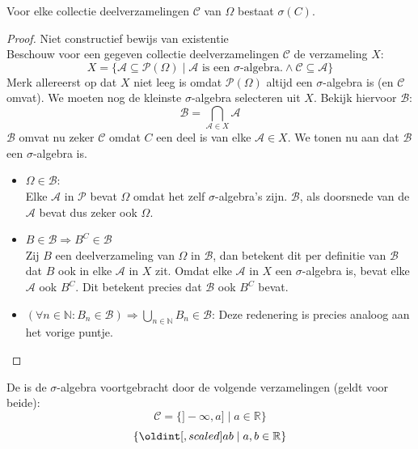 \documentclass[main.tex]{subfiles}
\begin{document}
\begin{ei}
  Voor elke collectie deelverzamelingen $\mathcal{C}$ van $\Omega$ bestaat $\sigma(C)$.

  \begin{proof}
    Niet constructief bewijs van existentie\\
    Beschouw voor een gegeven collectie deelverzamelingen $\mathcal{C}$ de verzameling $X$:
    \[ X = \{ \mathcal{A} \subseteq \mathcal{P}(\Omega) \mid \mathcal{A} \text{ is een $\sigma$-algebra.} \wedge \mathcal{C} \subseteq \mathcal{A} \} \]
    Merk allereerst op dat $X$ niet leeg is omdat $\mathcal{P}(\Omega)$ altijd een $\sigma$-algebra is (en $\mathcal{C}$ omvat).
    We moeten nog de kleinste $\sigma$-algebra selecteren uit $X$.
    Bekijk hiervoor $\mathcal{B}$:
    \[ \mathcal{B} = \bigcap_{\mathcal{A} \in X}\mathcal{A} \]
    $\mathcal{B}$ omvat nu zeker $\mathcal{C}$ omdat $C$ een deel is van elke $\mathcal{A} \in X$.
    We tonen nu aan dat $\mathcal{B}$ een $\sigma$-algebra is.
    \begin{itemize}
    \item $\Omega \in \mathcal{B}$:\\
      Elke $\mathcal{A}$ in $\mathcal{P}$ bevat $\Omega$ omdat het zelf $\sigma$-algebra's zijn.
      $\mathcal{B}$, als doorsnede van de $\mathcal{A}$ bevat dus zeker ook $\Omega$.
    \item $B \in \mathcal{B} \Rightarrow B^{C} \in \mathcal{B}$\\
      Zij $B$ een deelverzameling van $\Omega$ in $\mathcal{B}$, dan betekent dit per definitie van $\mathcal{B}$ dat $B$ ook in elke $\mathcal{A}$ in $X$ zit.
      Omdat elke $\mathcal{A}$ in $X$ een $\sigma$-algebra is, bevat elke $\mathcal{A}$ ook $B^{C}$.
      Dit betekent precies dat $\mathcal{B}$ ook $B^{C}$ bevat.
    \item $(\forall n\in \mathbb{N}: B_{n}\in \mathcal{B}) \Rightarrow \bigcup_{n\in \mathbb{N}} B_{n} \in \mathcal{B}$:
      Deze redenering is precies analoog aan het vorige puntje.
    \end{itemize}
  \end{proof}
\end{ei}

\begin{de}
  De  is de $\sigma$-algebra voortgebracht door de volgende verzamelingen (geldt voor beide):
  \[ \mathcal{C} = \{ ]-\infty,a] \mid a \in \mathbb{R} \} \]  
  \[ \left\{ \interval{a}{b} \mid a,b\in \mathbb{R} \right\} \]  
\end{de}
\end{document}
